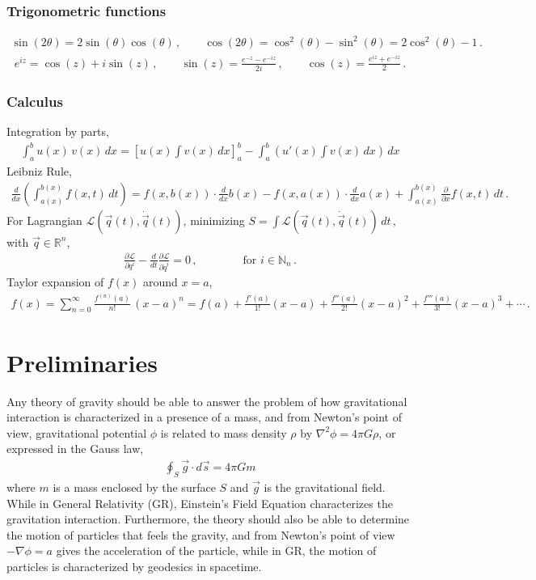 \documentclass[11pt, onesided]{book}
\theoremstyle{break}
\theoremstyle{break}
\newcommand{\R}{\mathbb{R}}
\newcommand{\N}{\mathbb{N}}
\newcommand{\pd}{\partial}
\begin{document}
\subsection*{Trigonometric functions}
\begin{align*}
\sin(2\theta) = 2\sin(\theta) \cos(\theta)\,,\qquad
\cos(2\theta) = \cos^2(\theta) - \sin^2(\theta) = 2\cos^2(\theta)-1\,.
\end{align*}
\begin{align*}
e^{iz} = \cos(z) + i\sin(z)\,,\qquad \sin(z) = \frac{e^{-z} - e^{-iz}}{2i}\,,\qquad \cos(z) = \frac{e^{iz} + e^{-iz}}{2}\,.
\end{align*}
\subsection*{Calculus}
Integration by parts,
\begin{align*}
\int_a^b u(x)\,v(x)\, dx = \left[u(x)\int v(x) \, dx\right]_a^b - \int_a^b \left(u'(x)\int v(x)\, dx \right)\,dx
\end{align*}
Leibniz Rule,
\begin{align*}
\frac{d}{dx}\left(\int_{a(x)}^{b(x)}
f(x,t) \, dt
\right) = f(x,b(x)) \cdot \frac{d}{dx}b(x) - f(x,a(x)) \cdot \frac{d}{dx}a(x) + \int_{a(x)}^{b(x)}\frac{\pd}{\pd x}f(x,t)\, dt\,.
\end{align*}
For Lagrangian $\mathcal{L}(\vec{q}(t),\dot{\vec{q}}(t))$, minimizing $S = \int \mathcal{L}(\vec{q}(t),\dot{\vec{q}}(t))\, dt\, $, with $\vec{q}\in \R^n$,
\begin{align*}
\frac{\pd \mathcal{L}}{\pd q^i} - \frac{d}{dt}\frac{\pd \mathcal{L}}{\pd \dot{q}^i} = 0\,,\qquad\qquad\text{for }i\in \N_n\,.
\end{align*}
Taylor expansion of $f(x)$ around $x = a$, 
\begin{align*}
f(x) =\sum_{n=0}^\infty \frac{f^{(n)}(a)}{n!}\, (x-a)^n =f(a) + \frac{f'(a)}{1!}(x-a) + \frac{f''(a)}{2!}(x-a)^2 + \frac{f'''(a)}{3!}(x-a)^3 + \cdots\,.
\end{align*}

\newpage
\chapter{Preliminaries}
\quad Any theory of gravity should be able to answer the problem of how gravitational interaction is characterized in a presence of a mass, and from Newton's point of view, gravitational potential $\phi$ is related to mass density $\rho$ by $\nabla^2 \phi = 4\pi G\rho$, or expressed in the Gauss law,
\begin{align*}
\oint_S \vec{g}\cdot d\vec{s} = 4\pi Gm
\end{align*}
where $m$ is a mass enclosed by the surface $S$ and $\vec{g}$ is the gravitational field. While in General Relativity (GR), Einstein's Field Equation characterizes the gravitation interaction. Furthermore, the theory should also be able to determine the motion of particles that feels the gravity, and from Newton's point of view $-\nabla \phi = a$ gives the acceleration of the particle, while in GR, the motion of particles is characterized by geodesics in spacetime. 
\end{document}
